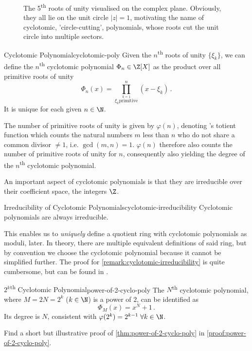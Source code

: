 \begin{figure}
  \centering
  \caption[The 5th roots of unity]{The 5\textsuperscript{th} roots of unity visualised on the complex plane. Obviously, they all lie on the unit circle $|z| = 1$, motivating the name of cyclotomic, 'circle-cutting', polynomials, whose roots cut the unit circle into multiple sectors.}
  \label{fig:nth-roots-of-unity}
\end{figure}

\begin{definition}{Cyclotomic Polynomial}{cyclotomic-poly}
  Given the $n$\textsuperscript{th} roots of unity $\{\xi_k\}$, we can define the $n$\textsuperscript{th}
  cyclotomic polynomial $\Phi_n \in \Z[X]$ as the product over all primitive roots of unity
  $$\Phi_n(x) = \prod_{\stackrel{k=1}{\xi_k \mathrm{primitive}}}^{n} (x - \xi_k) \,.$$
  It is unique for each given $n \in \N$.
\end{definition}
The number of primitive roots of unity is given by $\varphi(n)$, denoting 's totient function which counts the natural numbers $m$ less than $n$ who do not share a common divisor $\neq 1$, i.e. $\gcd(m, n) = 1$.
$\varphi(n)$ therefore also counts the number of primitive roots of unity for $n$, consequently also yielding the degree of the $n$\textsuperscript{th} cyclotomic polynomial.

An important aspect of cyclotomic polynomials is that they are irreducible over their coefficient space, the integers $\Z$.
\begin{remark}{Irreducibility of Cyclotomic Polynomials}{cyclotomic-irreducibility}
  Cyclotomic polynomials are always irreducible.
\end{remark}
This enables us to \textit{uniquely} define a quotient ring with cyclotomic polynomials as moduli, later.
In theory, there are multiple equivalent definitions of said ring, but by convention we choose the cyclotomic polynomial because it cannot be simplified further.
The proof for \cref{remark:cyclotomic-irreducibility} is quite cumbersome, but can be found in \cite{2002-serge-algebra}.

\begin{theorem}{$2^k$\textsuperscript{th} Cyclotomic Polynomial}{power-of-2-cyclo-poly}
  The $N$\textsuperscript{th} cyclotomic polynomial, where $M = 2N = 2^k$ ($k \in \N$) is a power of $2$, can be identified as
  $$\Phi_{M}(x) = x^{N} + 1\,.$$
  Its degree is $N$, consistent with $\varphi(2^k) = 2^{k-1} \; \forall k \in \N$.
\end{theorem}
Find a short but illustrative proof of \cref{thm:power-of-2-cyclo-poly} in \cref{proof:power-of-2-cyclo-poly}.

